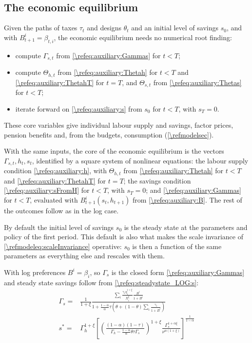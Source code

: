 \subsection{The economic equilibrium}\label{\refsec:EE}

Given the paths of taxes $\tau_t$ and designs $\theta_t$ and an initial level of savings $s_0$, and with $B_{t+1}^i = \beta_{t,i}$, the economic equilibrium needs no numerical root finding:
\begin{itemize}
    \item compute $\Gamma_{s,t}$ from \eqref{\refeq:auxiliary:Gammas} for $t<T$;
    \item compute $\Theta_{h,t}$ from \eqref{\refeq:auxiliary:Thetah} for $t<T$ and \eqref{\refeq:auxiliary:ThetahT} for $t=T$, and $\Theta_{s,t}$ from \eqref{\refeq:auxiliary:Thetas} for $t<T$;
    \item iterate forward on \eqref{\refeq:auxiliary:s} from $s_0$ for $t<T$, with $s_T = 0$.
\end{itemize}
These core variables give individual labour supply and savings, factor prices, pension benefits and, from the budgets, consumption (\cref{\refmodelsec}).


With the same inputs, the core of the economic equilibrium is the vectors $\Gamma_{s,t}, h_t, s_t$, identified by a square system of nonlinear equations: the labour supply condition \eqref{\refeq:auxiliary:h}, with $\Theta_{h,t}$ from \eqref{\refeq:auxiliary:Thetah} for $t<T$ and \eqref{\refeq:auxiliary:ThetahT} for $t=T$; the savings condition \eqref{\refeq:auxiliary:sFromH} for $t<T$, with $s_T = 0$; and \eqref{\refeq:auxiliary:Gammas} for $t<T$, evaluated with $B_{t+1}^i(s_t, h_{t+1})$ from \eqref{\refeq:auxiliary:B}. The rest of the outcomes follow as in the log case.


By default the initial level of savings $s_0$ is the steady state at the parameters and policy of the first period. This default is also what makes the scale invariance of \eqref{\refmodeleq:scaleInvariance} operative: $s_0$ is then a function of the same parameters as everything else and rescales with them.

With log preferences $B^i = \beta_i$, so $\Gamma_{s}$ is the closed form \eqref{\refeq:auxiliary:Gammas} and steady state savings follow from \eqref{\refeq:steadystate_LOG:s}:
\begin{subequations}\label{\refeq:steadystate_LOG}
    \begin{align}
        \Gamma_s =& \frac{1}{1+\xi}\frac{\sum_i \frac{\gamma_{i}\eta_{i}^{1+\xi}}{X_{i}^{\xi}}\frac{B^i}{1+B^i}}{1+\frac{1-\alpha}{\alpha}\tau\left(\theta+(1-\theta)\sum_i\frac{\gamma_{i}}{1+B^i}\right)} \label{\refeq:steadystate_LOG:Gammas}\\
         s^* =& \Gamma_h^{1+\xi}\left[\left(\frac{(1-\alpha)(1-\tau)}{\Gamma_h-\frac{1-\alpha}{\alpha}\theta\tau\Gamma_s}\right)^{1+\xi}\frac{\Gamma_s^{1+\alpha\xi}}{\nu^{\alpha(1+\xi)}}\right]^{\frac{1}{1-\alpha}} \label{\refeq:steadystate_LOG:s}
    \end{align}
\end{subequations}

